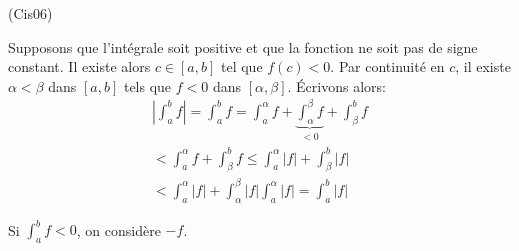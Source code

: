 \begin{tiny}(Cis06)\end{tiny} Supposons que l'intégrale soit positive et que la fonction ne soit pas de signe constant. Il existe alors $c\in [a,b]$ tel que $f(c)<0$. Par continuité en $c$, il existe $\alpha < \beta$ dans $[a,b]$ tels que $f<0$ dans $[\alpha,\beta]$. \'Ecrivons alors:
\begin{multline*}
  \left|\int_a^b f \right| = \int_a^b f =
\int_a^\alpha f  + \underset{<0}{\underbrace{\int_\alpha^\beta f}} +\int_\beta^b f \\
< \int_a^\alpha f +\int_\beta^b f
\leq \int_a^\alpha |f| +\int_\beta^b |f|\\
< \int_a^\alpha |f| +\int_\alpha^\beta |f|\int_a^\alpha |f| = \int_a^b |f|
\end{multline*}

Si $\int_a^b f <0$, on considère $-f$.
